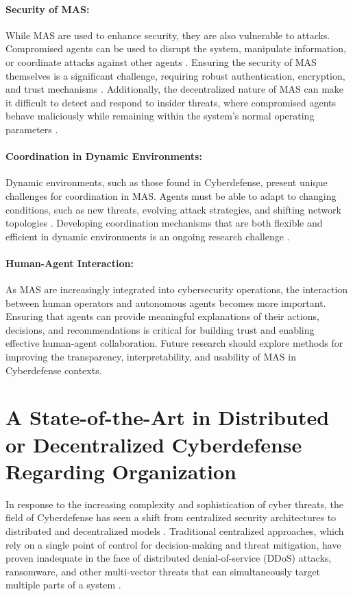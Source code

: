 \paragraph{Security of MAS:}
While MAS are used to enhance security, they are also vulnerable to attacks. Compromised agents can be used to disrupt the system, manipulate information, or coordinate attacks against other agents \cite{kolias2011swarm}. Ensuring the security of MAS themselves is a significant challenge, requiring robust authentication, encryption, and trust mechanisms \cite{kolias2011swarm}. Additionally, the decentralized nature of MAS can make it difficult to detect and respond to insider threats, where compromised agents behave maliciously while remaining within the system's normal operating parameters \cite{kolias2011swarm}.

\paragraph{Coordination in Dynamic Environments:}
Dynamic environments, such as those found in Cyberdefense, present unique challenges for coordination in MAS. Agents must be able to adapt to changing conditions, such as new threats, evolving attack strategies, and shifting network topologies \cite{kolias2011swarm}. Developing coordination mechanisms that are both flexible and efficient in dynamic environments is an ongoing research challenge \cite{kolias2011swarm}.

\paragraph{Human-Agent Interaction:}
As MAS are increasingly integrated into cybersecurity operations, the interaction between human operators and autonomous agents becomes more important. Ensuring that agents can provide meaningful explanations of their actions, decisions, and recommendations is critical for building trust and enabling effective human-agent collaboration. Future research should explore methods for improving the transparency, interpretability, and usability of MAS in Cyberdefense contexts.



\section{A State-of-the-Art in Distributed or Decentralized Cyberdefense Regarding Organization}

In response to the increasing complexity and sophistication of cyber threats, the field of Cyberdefense has seen a shift from centralized security architectures to distributed and decentralized models \cite{Chen2021, Misra2023}. Traditional centralized approaches, which rely on a single point of control for decision-making and threat mitigation, have proven inadequate in the face of distributed denial-of-service (DDoS) attacks, ransomware, and other multi-vector threats that can simultaneously target multiple parts of a system \cite{Munsing2018}.

